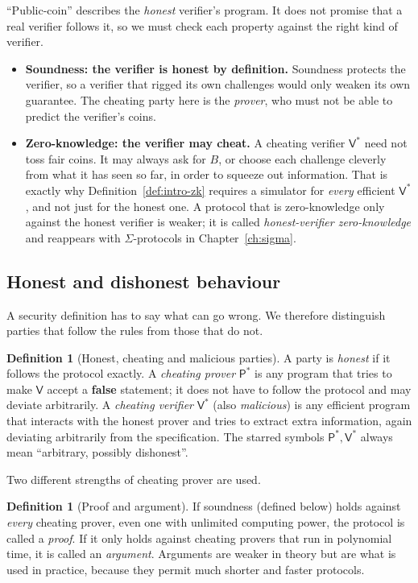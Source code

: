 \documentclass[11pt,a4paper]{report}
\theoremstyle{plain}
\theoremstyle{definition}
\newtheorem{definition}[theorem]{Definition}
\theoremstyle{remark}
\newcommand{\Prv}{\mathsf{P}}\newcommand{\Ver}{\mathsf{V}}
\begin{document}
\begin{intuition}
``Public-coin'' describes the \emph{honest} verifier's program. It does not promise that a real verifier follows it, so we must check each property against the right kind of verifier.
\begin{itemize}
\item \textbf{Soundness: the verifier is honest by definition.} Soundness protects the verifier, so a verifier that rigged its own challenges would only weaken its own guarantee. The cheating party here is the \emph{prover}, who must not be able to predict the verifier's coins.
\item \textbf{Zero-knowledge: the verifier may cheat.} A cheating verifier $\Ver^*$ need not toss fair coins. It may always ask for $B$, or choose each challenge cleverly from what it has seen so far, in order to squeeze out information. That is exactly why Definition~\ref{def:intro-zk} requires a simulator for \emph{every} efficient $\Ver^*$, and not just for the honest one. A protocol that is zero-knowledge only against the honest verifier is weaker; it is called \emph{honest-verifier zero-knowledge} and reappears with $\Sigma$-protocols in Chapter~\ref{ch:sigma}.
\end{itemize}
\end{intuition}

\subsection{Honest and dishonest behaviour}
A security definition has to say what can go wrong. We therefore distinguish parties that follow the rules from those that do not.

\begin{definition}[Honest, cheating and malicious parties]\label{def:intro-honest}
A party is \emph{honest} if it follows the protocol exactly. A \emph{cheating prover} $\Prv^*$ is any program that tries to make $\Ver$ accept a \textbf{false} statement; it does not have to follow the protocol and may deviate arbitrarily. A \emph{cheating verifier} $\Ver^*$ (also \emph{malicious}) is any efficient program that interacts with the honest prover and tries to extract extra information, again deviating arbitrarily from the specification. The starred symbols $\Prv^*,\Ver^*$ always mean ``arbitrary, possibly dishonest''.
\end{definition}

Two different strengths of cheating prover are used.
\begin{definition}[Proof and argument]\label{def:intro-arg}
If soundness (defined below) holds against \emph{every} cheating prover, even one with unlimited computing power, the protocol is called a \emph{proof}. If it only holds against cheating provers that run in polynomial time, it is called an \emph{argument}. Arguments are weaker in theory but are what is used in practice, because they permit much shorter and faster protocols.
\end{definition}
\end{document}
